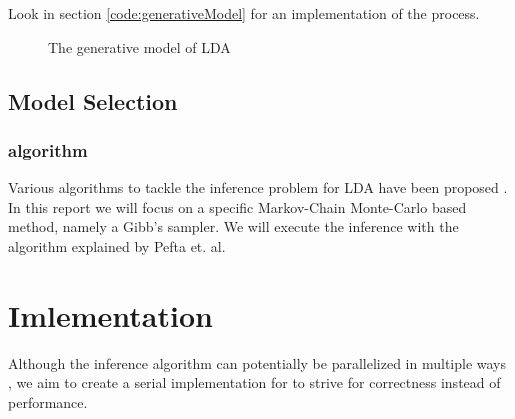 \documentclass[12 pt,twopage]{article}
\begin{document}
Look in section \ref{code:generativeModel} for an implementation of the process.
\onecolumn
\begin{figure}[h]
 \begin{center}
  \begin{algorithm}[H]
   
  \end{algorithm}
  \caption{The generative model of LDA  \cite{Blei2003,Heinrich2005}}\label{fig:generativeProcess}
 \end{center}
\end{figure}
\subsection{Model Selection}

\subsubsection{algorithm}
Various algorithms to tackle the inference problem for LDA have been proposed \cite{Blei2003}. In this report we will focus on a specific Markov-Chain Monte-Carlo based method, namely a Gibb's sampler. We will execute the inference with the algorithm explained by Pefta et. al.
\section{Imlementation}
Although the inference algorithm can potentially be parallelized in multiple ways \cite{Newman2006ScalablePT,Wang2009PLDAPL}, we aim to create a serial implementation for to strive for correctness instead of performance.
\end{document}
